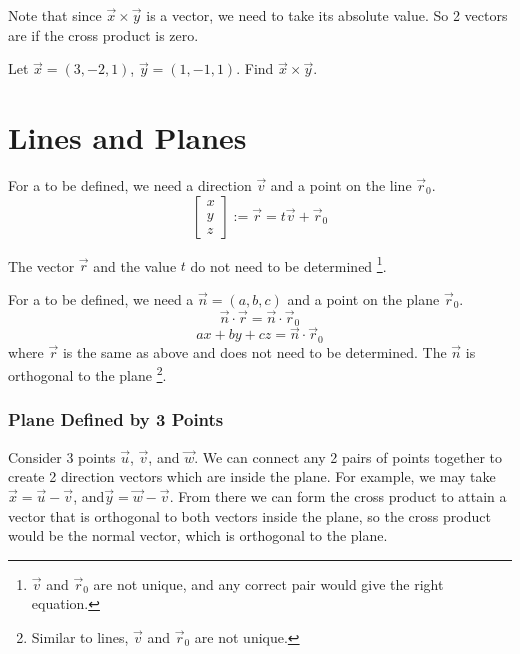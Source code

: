 \documentclass[11pt,fleqn]{book} %
\begin{document}
Note that since $\vec{x} \times \vec{y}$ is a vector, we need to take its absolute value. So 2 vectors are  if the cross product is zero.

\begin{exercise}
    Let $\vec{x} = (3, -2, 1)$, $\vec{y} = (1, -1, 1)$. Find $\vec{x} \times \vec{y}$.
\end{exercise}

\section{Lines and Planes}

For a  to be defined, we need a direction $\vec{v}$ and a point on the line $\vec{r}_0$. $$\begin{bmatrix} x \\ y \\ z \end{bmatrix} := \vec{r} = t\vec{v} + \vec{r}_0$$

The vector $\vec{r}$ and the value $t$ do not need to be determined \footnote{$\vec{v}$ and $\vec{r}_0$ are not unique, and any correct pair would give the right equation. }.

For a  to be defined, we need a  $\vec{n} = (a, b, c)$ and a point on the plane $\vec{r}_0$. $$\vec{n} \cdot \vec{r} = \vec{n} \cdot \vec{r}_0$$ $$ax + by + cz = \vec{n} \cdot \vec{r}_0$$ where $\vec{r}$ is the same as above and does not need to be determined. The  $\vec{n}$ is orthogonal to the plane \footnote{Similar to lines, $\vec{v}$ and $\vec{r}_0$ are not unique. }.

\subsubsection*{Plane Defined by 3 Points}

Consider 3 points $\vec{u}$, $\vec{v}$, and $\vec{w}$. We can connect any 2 pairs of points together to create 2 direction vectors which are inside the plane. For example, we may take $\vec{x} = \vec{u} - \vec{v}$, and$ \vec{y} = \vec{w} - \vec{v}$. From there we can form the cross product to attain a vector that is orthogonal to both vectors inside the plane, so the cross product would be the normal vector, which is orthogonal to the plane.
\end{document}
